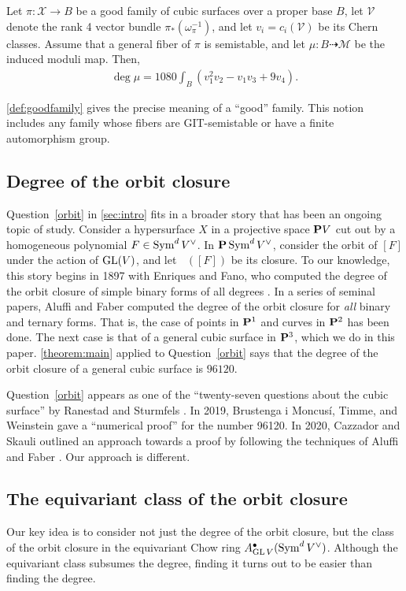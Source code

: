 \documentclass[12pt,reqno]{amsart}
\DeclareMathOperator{\Orb}{\overline{Orb}}
\renewcommand{\to}{{\longrightarrow}}
\numberwithin{equation}{section}
\newcommand{\V}{\mathcal V}
\newcommand{\cX}{\mathcal{X}}
\begin{document}
\begin{theorem}\label{theorem:main}
  Let $\pi \colon \cX \to B$ be a good family of cubic surfaces over a
  proper base $B$, let $\V$ denote the rank 4 vector bundle
  $ \pi_* \left(\omega_\pi^{-1}\right)$, and let
  \(v_i = c_i\left(\V\right)\) be its Chern classes.  Assume that a
  general fiber of $\pi$ is semistable, and let
  $\mu \colon B \dashrightarrow \mathcal M$ be the induced moduli map.  Then,
  \begin{align}
    \deg \mu =
    \label{eq:MAIN}
    1080 \int_{B} \left(v_{1}^{2}v_{2} - v_{1}v_{3}+ 9v_{4}\right).
  \end{align}
\end{theorem}
\autoref{def:goodfamily} gives the precise meaning of a ``good''
family.  This notion includes any family whose fibers are
GIT-semistable or have a finite automorphism group.

\subsection{Degree of the orbit closure}
Question~\ref{orbit} in \autoref{sec:intro} fits in a broader story
that has been an ongoing topic of study.  Consider a hypersurface
\(X\) in a projective space $\P V$ cut out by a homogeneous polynomial
$F \in \Sym^d V^\vee$.  In $\P\Sym^dV^\vee$, consider the orbit of
$[F]$ under the action of $\GL(V)$, and let $\Orb([F])$ be its
closure.  To our knowledge, this story begins in 1897 with Enriques
and Fano, who computed the degree of the orbit closure of simple
binary forms of all degrees \cite{enr.fan:97}.  In a series of
seminal papers, Aluffi and Faber computed the degree of the orbit
closure for \emph{all} binary and ternary forms.  That is, the case of
points in $\P^1$ and curves in $\P^2$ has been done.  The next case is
that of a general cubic surface in $\P^3$, which we do in this paper.
\autoref{theorem:main} applied to Question~\ref{orbit} says that the
degree of the orbit closure of a general cubic surface is $96120$.

Question~\ref{orbit} appears as one of the ``twenty-seven questions
about the cubic surface'' by Ranestad and Sturmfels \cite{ran.stu:20}.
In 2019, Brustenga i Moncus\'i, Timme, and Weinstein gave a
``numerical proof'' for the number 96120. In 2020, Cazzador and
Skauli outlined an approach towards a proof by following the
techniques of Aluffi and Faber \cite{bru-i-mon.tim.wei:20,caz.ska:20}.
Our approach is different.

\subsection{The equivariant class of the orbit closure}
Our key idea is to consider not just the degree of the orbit closure,
but the class of the orbit closure in the equivariant Chow ring
$A^\bullet_{\GL V}(\Sym^dV^\vee)$. Although the equivariant class subsumes the
degree, finding it turns out to be easier than finding the degree.
\end{document}
